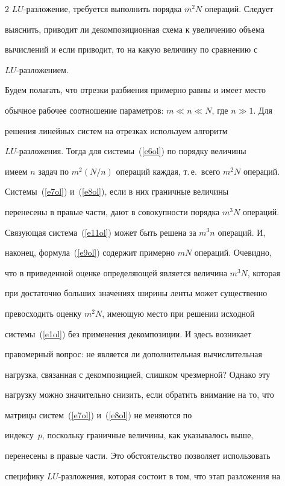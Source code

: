 \begin{multicols}{2}
$LU$-разложение, требуется выполнить порядка $m^2N$ операций. Следует


выяснить, приводит ли декомпозиционная схема к увеличению объема


вычислений и если приводит, то на какую величину по сравнению с


     $LU$-разложением.





     Будем полагать, что отрезки разбиения примерно равны и имеет место


обычное рабочее соотношение параметров: $m \ll n \ll N$, где $n \gg 1$. Для


решения линейных систем на отрезках используем алгоритм


     $LU$-разложения. Тогда для системы~(\ref{e6ol}) по порядку величины


имеем $n$ задач по $m^2(N/n)$ операций каждая, т.\,е.\ всего $m^2N$ операций.


Сис\-те\-мы~(\ref{e7ol}) и~(\ref{e8ol}), если в них граничные величины


перенесены в правые части, дают в совокупности порядка $m^3N$ операций.


Связующая система~(\ref{e11ol}) может быть решена за $m^3n$ операций. И,


наконец, формула~(\ref{e9ol}) содержит примерно $mN$ операций. Очевидно,


что в приведенной оценке определяющей является величина $m^3N$, которая


при достаточно больших значениях ширины ленты может существенно


превосходить оценку $m^2N$, име\-ющую место при решении исходной


системы~(\ref{e1ol}) без применения декомпозиции. И здесь возникает


правомерный вопрос: не является ли дополнительная вычислительная


нагрузка, связанная с декомпозицией, слишком чрезмерной? Однако эту


нагрузку можно значительно снизить, если обратить внимание на то, что


матрицы систем~(\ref{e7ol}) и~(\ref{e8ol}) не меняются по


индексу~$p$, поскольку граничные величины, как указывалось выше,


перенесены в правые части. Это обстоятельство позволяет использовать


специфику $LU$-разложения, которая состоит в том, что этап разложения на



\end{multicols}
